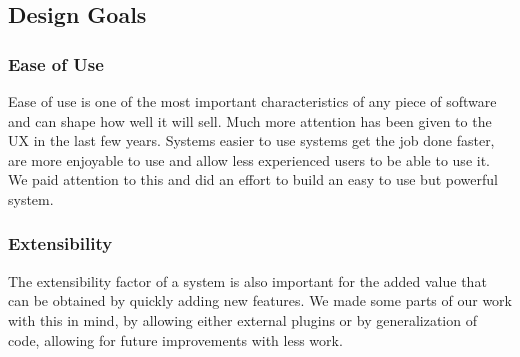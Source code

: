 



\subsection{Design Goals} %
\label{sub:design_goal}


\subsubsection{Ease of Use} %
\label{ssub:ease_of_use}

Ease of use is one of the most important characteristics of any piece of software and can shape how well it will sell. Much more attention has been given to the \ac{UX} in the last few years. Systems easier to use systems get the job done faster, are more enjoyable to use and allow less experienced users to be able to use it. We paid attention to this and did an effort to build an easy to use but powerful system.



\subsubsection{Extensibility} %
\label{ssub:Extensibility}

The extensibility factor of a system is also important for the added value that can be obtained by quickly adding new features. We made some parts of our work with this in mind, by allowing either external plugins or by generalization of code, allowing for future improvements with less work.

